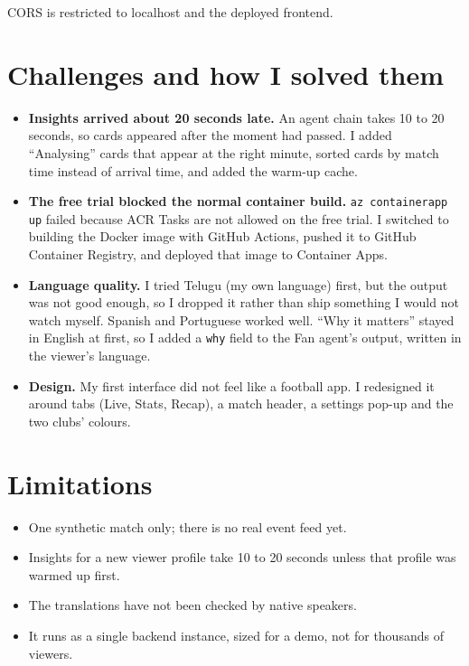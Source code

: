 \documentclass[11pt,a4paper]{article}
\newcommand{\code}[1]{\texttt{#1}}
\begin{document}
CORS is restricted to localhost and the deployed frontend.

\section{Challenges and how I solved them}

\begin{itemize}
  \item \textbf{Insights arrived about 20 seconds late.} An agent chain takes 10 to 20 seconds, so cards appeared after the moment had passed. I added ``Analysing'' cards that appear at the right minute, sorted cards by match time instead of arrival time, and added the warm-up cache.
  \item \textbf{The free trial blocked the normal container build.} \code{az containerapp up} failed because ACR Tasks are not allowed on the free trial. I switched to building the Docker image with GitHub Actions, pushed it to GitHub Container Registry, and deployed that image to Container Apps.
  \item \textbf{Language quality.} I tried Telugu (my own language) first, but the output was not good enough, so I dropped it rather than ship something I would not watch myself. Spanish and Portuguese worked well. ``Why it matters'' stayed in English at first, so I added a \code{why} field to the Fan agent's output, written in the viewer's language.
  \item \textbf{Design.} My first interface did not feel like a football app. I redesigned it around tabs (Live, Stats, Recap), a match header, a settings pop-up and the two clubs' colours.
\end{itemize}

\section{Limitations}

\begin{itemize}
  \item One synthetic match only; there is no real event feed yet.
  \item Insights for a new viewer profile take 10 to 20 seconds unless that profile was warmed up first.
  \item The translations have not been checked by native speakers.
  \item It runs as a single backend instance, sized for a demo, not for thousands of viewers.
\end{itemize}
\end{document}
